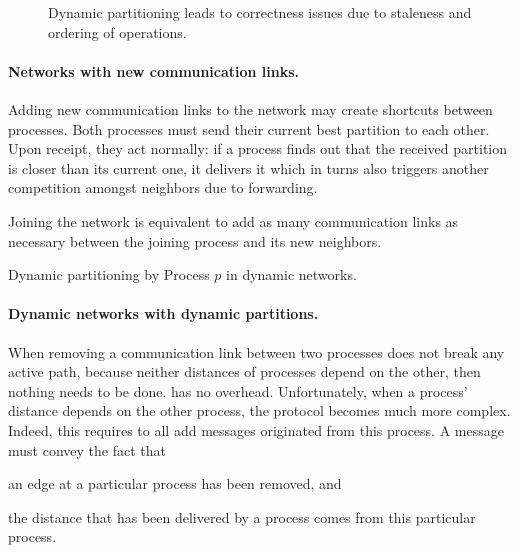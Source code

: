 \begin{figure*}
  \begin{center}
    \hspace{10pt}
    \caption{\label{fig:proof}Dynamic partitioning leads to correctness issues due to
      staleness and ordering of operations.}
  \end{center}
\end{figure*}

\paragraph{Networks with new communication links.}
Adding new communication links to the network may create shortcuts
between processes. Both processes must send their current best
partition to each other. Upon receipt, they act normally: if a process
finds out that the received partition is closer than its current one,
it delivers it which in turns also triggers another competition
amongst neighbors due to forwarding.

\noindent Joining the network is equivalent to add as many
communication links as necessary between the joining process and its
new neighbors.

\begin{algorithm}
  
  \caption{\label{algo:edges}Dynamic partitioning by Process $p$ in dynamic networks.}
\end{algorithm}


\paragraph{Dynamic networks with dynamic partitions.}
When removing a communication link between two processes does not
break any active path, because neither distances of processes depend
on the other, then nothing needs to be done. \NAME has no overhead.
Unfortunately, when a process' distance depends on the other process,
the protocol becomes much more complex. Indeed, this requires to
 all add messages originated from this process. A message
must convey the fact that
\begin{inparaenum}[(i)]
\item an edge at a particular process has been removed, and
\item the distance that has been delivered by a process comes from
  this particular process.
\end{inparaenum}

